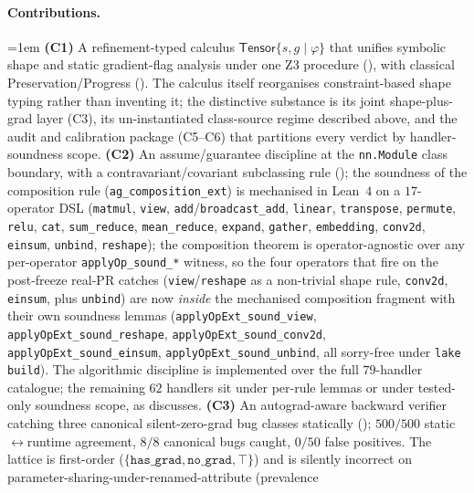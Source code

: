 \paragraph{Contributions.}\hangindent=1em
\textbf{(C1)} A refinement-typed calculus
$\mathsf{Tensor}\{s,g\mid\varphi\}$ that unifies symbolic shape
and static gradient-flag analysis under one Z3 procedure
(), with classical
Preservation/Progress ().
The calculus itself reorganises constraint-based shape
typing rather than inventing it; the distinctive substance
is its joint shape-plus-grad layer (C3), its un-instantiated
class-source regime described above, and the audit and
calibration package (C5--C6) that partitions every verdict
by handler-soundness scope.
\textbf{(C2)} An assume/guarantee discipline at the
\texttt{nn.Module} class boundary, with a contravariant/covariant
subclassing rule (); the soundness of the
composition rule (\texttt{ag\_composition\_ext}) is mechanised in
Lean~$4$ on a $17$-operator DSL (\texttt{matmul}, \texttt{view},
\texttt{add}/\texttt{broadcast\_add}, \texttt{linear},
\texttt{transpose}, \texttt{permute}, \texttt{relu},
\texttt{cat}, \texttt{sum\_reduce}, \texttt{mean\_reduce},
\texttt{expand}, \texttt{gather}, \texttt{embedding},
\texttt{conv2d}, \texttt{einsum}, \texttt{unbind}, \texttt{reshape});
the composition theorem is operator-agnostic over any per-operator
\texttt{applyOp\_sound\_*} witness, so the four operators that fire
on the post-freeze real-PR catches
(\texttt{view}/\texttt{reshape} as a non-trivial shape rule,
\texttt{conv2d}, \texttt{einsum}, plus \texttt{unbind}) are now
\emph{inside} the mechanised composition fragment with their own
soundness lemmas (\texttt{applyOpExt\_sound\_view},
\texttt{applyOpExt\_sound\_reshape},
\texttt{applyOpExt\_sound\_conv2d},
\texttt{applyOpExt\_sound\_einsum},
\texttt{applyOpExt\_sound\_unbind}, all sorry-free under
\texttt{lake build}). The algorithmic discipline is implemented
over the full $79$-handler catalogue; the remaining $62$ handlers
sit under per-rule lemmas or under tested-only soundness scope, as
 discusses.
\textbf{(C3)} An autograd-aware backward verifier catching
three canonical silent-zero-grad bug classes statically
(); $500/500$ static$\leftrightarrow$runtime
agreement, $8/8$ canonical bugs caught, $0/50$ false positives.
The lattice is first-order
($\{\texttt{has\_grad},\texttt{no\_grad},\top\}$) and is silently
incorrect on parameter-sharing-under-renamed-attribute (prevalence
